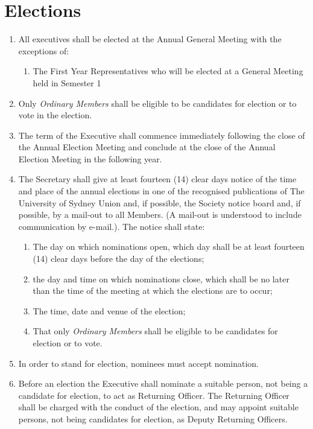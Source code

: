 \documentclass[11pt]{article}
\begin{document}
\section{Elections}
\begin{enumerate}[\thesection .1]
    \item All executives shall be elected at the Annual General Meeting with the exceptions of:
    \begin{enumerate}[\hspace{5mm}1. ]
        \item The First Year Representatives who will be elected at a General Meeting held in Semester 1
    \end{enumerate}
    \item Only \textit{Ordinary Members} shall be eligible to be candidates for election or to vote in the election.
    \item The term of the Executive shall commence immediately following the close of the Annual Election Meeting and conclude at the close of the Annual Election Meeting in the following year.
    \item The Secretary shall give at least fourteen (14) clear days notice of the time and place of the annual elections in one of the recognised publications of The University of Sydney Union and, if possible, the Society notice board and, if possible, by a mail-out to all Members. (A mail-out is understood to include communication by e-mail.).  The notice shall state:
    \begin{enumerate}[\hspace{5mm}1.]
        \item The day on which nominations open, which day shall be at least fourteen (14) clear days before the day of the elections;
        \item  the day and time on which nominations close, which shall be no later than the time of the meeting at which the elections are to occur;
        \item The time, date and venue of the election;
        \item That only \textit{Ordinary Members} shall be eligible to be candidates for election or to vote.
    \end{enumerate}
    \item In order to stand for election, nominees must accept nomination.
    \item Before an election the Executive shall nominate a suitable person, not being a candidate for election, to act as Returning Officer. The Returning Officer shall be charged with the conduct of the election, and may appoint suitable persons, not being candidates for election, as Deputy Returning Officers.

\end{enumerate}
\end{document}
